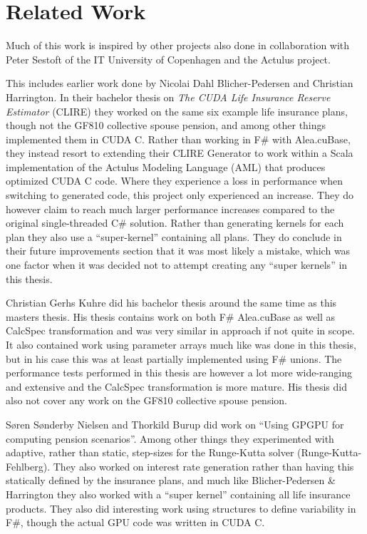 \section{Related Work}\label{sec:relatedwork}
Much of this work is inspired by other projects also done in collaboration with Peter Sestoft of the IT University of Copenhagen and the Actulus project\cite{actulus}.

This includes earlier work done by Nicolai Dahl Blicher-Pedersen and Christian Harrington.
In their bachelor thesis on \emph{The CUDA Life Insurance Reserve Estimator} (CLIRE)\cite{dahlharrington} they worked on the same six example life insurance plans, though not the GF810 collective spouse pension, and among other things implemented them in CUDA C.
Rather than working in F\# with Alea.cuBase, they instead resort to extending their CLIRE Generator to work within a Scala implementation of the Actulus Modeling Language (AML) that produces optimized CUDA C code.
Where they experience a loss in performance when switching to generated code, this project only experienced an increase.
They do however claim to reach much larger performance increases compared to the original single-threaded C\# solution.
Rather than generating kernels for each plan they also use a ``super-kernel'' containing all plans. 
They do conclude in their future improvements section that it was most likely a mistake, which was one factor when it was decided not to attempt creating any ``super kernels'' in this thesis.

Christian Gerhs Kuhre\cite{christiangk} did his bachelor thesis around the same time as this masters thesis.
His thesis contains work on both F\# Alea.cuBase as well as CalcSpec transformation and was very similar in approach if not quite in scope.
It also contained work using parameter arrays much like was done in this thesis, but in his case this was at least partially implemented using F\# unions.
The performance tests performed in this thesis are however a lot more wide-ranging and extensive and the CalcSpec transformation is more mature.
His thesis did also not cover any work on the GF810 collective spouse pension.

S\o{}ren S\o{}nderby Nielsen and Thorkild Burup did work on ``Using GPGPU for computing pension scenarios''\cite{nielsenburup}. 
Among other things they experimented with adaptive, rather than static, step-sizes for the Runge-Kutta solver (Runge-Kutta-Fehlberg).
They also worked on interest rate generation rather than having this statically defined by the insurance plans, and much like Blicher-Pedersen \& Harrington they also worked with a ``super kernel'' containing all life insurance products.
They also did interesting work using structures to define variability in F\#, though the actual GPU code was written in CUDA C.

